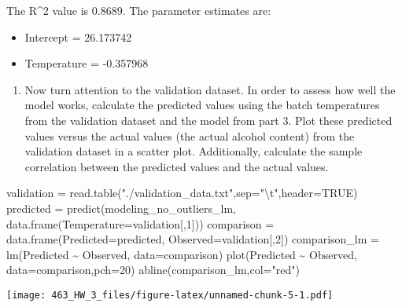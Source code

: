 \documentclass[
]{article}
\newenvironment{Shaded}{\begin{snugshade}}{\end{snugshade}}
\newcommand{\AttributeTok}[1]{\textcolor[rgb]{0.77,0.63,0.00}{#1}}
\newcommand{\ConstantTok}[1]{\textcolor[rgb]{0.00,0.00,0.00}{#1}}
\newcommand{\DecValTok}[1]{\textcolor[rgb]{0.00,0.00,0.81}{#1}}
\newcommand{\FunctionTok}[1]{\textcolor[rgb]{0.00,0.00,0.00}{#1}}
\newcommand{\NormalTok}[1]{#1}
\newcommand{\OtherTok}[1]{\textcolor[rgb]{0.56,0.35,0.01}{#1}}
\newcommand{\SpecialCharTok}[1]{\textcolor[rgb]{0.00,0.00,0.00}{#1}}
\newcommand{\StringTok}[1]{\textcolor[rgb]{0.31,0.60,0.02}{#1}}
\providecommand{\tightlist}{%
  \setlength{\itemsep}{0pt}\setlength{\parskip}{0pt}}
\begin{document}
The R\^{}2 value is 0.8689. The parameter estimates are:

\begin{itemize}
\item
  Intercept = 26.173742
\item
  Temperature = -0.357968
\end{itemize}

\begin{enumerate}
\def\labelenumi{\arabic{enumi})}
\setcounter{enumi}{3}
\tightlist
\item
  Now turn attention to the validation dataset. In order to assess how
  well the model works, calculate the predicted values using the batch
  temperatures from the validation dataset and the model from part 3.
  Plot these predicted values versus the actual values (the actual
  alcohol content) from the validation dataset in a scatter plot.
  Additionally, calculate the sample correlation between the predicted
  values and the actual values.
\end{enumerate}

\begin{Shaded}
\begin{Highlighting}[]
\NormalTok{validation }\OtherTok{=} \FunctionTok{read.table}\NormalTok{(}\StringTok{"./validation\_data.txt"}\NormalTok{,}\AttributeTok{sep=}\StringTok{"}\SpecialCharTok{\textbackslash{}t}\StringTok{"}\NormalTok{,}\AttributeTok{header=}\ConstantTok{TRUE}\NormalTok{)}
\NormalTok{predicted }\OtherTok{=} \FunctionTok{predict}\NormalTok{(modeling\_no\_outliers\_lm, }\FunctionTok{data.frame}\NormalTok{(}\AttributeTok{Temperature=}\NormalTok{validation[,}\DecValTok{1}\NormalTok{]))}
\NormalTok{comparison }\OtherTok{=} \FunctionTok{data.frame}\NormalTok{(}\AttributeTok{Predicted=}\NormalTok{predicted, }\AttributeTok{Observed=}\NormalTok{validation[,}\DecValTok{2}\NormalTok{])}
\NormalTok{comparison\_lm }\OtherTok{=} \FunctionTok{lm}\NormalTok{(Predicted }\SpecialCharTok{\textasciitilde{}}\NormalTok{ Observed, }\AttributeTok{data=}\NormalTok{comparison)}
\FunctionTok{plot}\NormalTok{(Predicted }\SpecialCharTok{\textasciitilde{}}\NormalTok{ Observed, }\AttributeTok{data=}\NormalTok{comparison,}\AttributeTok{pch=}\DecValTok{20}\NormalTok{)}
\FunctionTok{abline}\NormalTok{(comparison\_lm,}\AttributeTok{col=}\StringTok{"red"}\NormalTok{)}
\end{Highlighting}
\end{Shaded}

\texttt{[image: 463\_HW\_3\_files/figure-latex/unnamed-chunk-5-1.pdf]}
\end{document}
